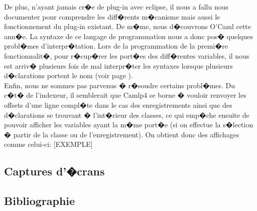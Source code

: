 \documentclass[a4paper,11pt,titlepage]{article}
\begin{document}
De plus, n'ayant jamais cr�e de plug-in avec eclipse, il nous a fallu nous documenter pour comprendre les diff�rents m�canisme mais aussi le fonctionnement du plug-in existant. De m�me, nous d�couvrons O'Caml cette ann�e. La syntaxe de ce langage de programmation nous a donc pos� quelques probl�mes d'interpr�tation. Lors de la programmation de la premi�re fonctionnalit�, pour r�cup�rer les port�es des diff�rentes variables, il nous est arriv� plusieurs fois de mal interpr�ter les syntaxes lorsque plusieurs d�clarations portent le nom (voir page \pageref{caml1}).\\

Enfin, nous ne sommes pas parvenus � r�soudre certains probl�mes. Du c�t� de l'indexeur, il semblerait que Camlp4 se borne � vouloir renvoyer les offsets d'une ligne compl�te dans le cas des enregistrements ainsi que des d�clarations se trouvant � l'int�rieur des classes, ce qui emp�che ensuite de pouvoir afficher les variables ayant la m�me port�e (si on effectue la s�lection � partir de la classe ou de l'enregistrement). On obtient donc des affichages comme celui-ci: [EXEMPLE]

\newpage
\subsection{Captures d'�crans}

\newpage
\subsection{Bibliographie}

\begin{flushleft}
 
 
 \nocite{*}
\end{flushleft}
\end{document}
